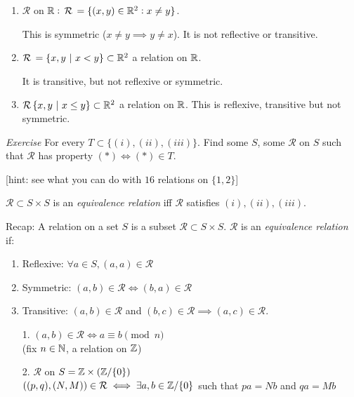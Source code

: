 \documentclass[twoside]{scrartcl}
\newcommand{\rel}{\mathcal{R}}
\begin{document}
\begin{examples}
	\begin{enumerate}
	\item $\rel$ on $\R: \,\rel\, = \{(x,y) \iR^2 : x \neq y\}$.
	
	This is symmetric ($x \neq y \implies y \neq x$). It is not reflective or transitive. 
	\item $\rel\, = \{x,y ~|~ x < y\} \subset \R^2$ a relation on $\mathbb{R}$. 	
	
	It is transitive, but not reflexive or symmetric. 
	
	\item $\rel\, \{x,y ~|~ x \leq y\} \subset \R^2$ a relation on $\mathbb{R}$. This is reflexive, transitive but not symmetric. 
	\end{enumerate}

\end{examples} 


\emph{Exercise} For every $T \subset \{(i),(ii),(iii)\}$. Find some $S$, some $\rel$ on $S$ such that $\rel$ has property $(*) \iff (*) \in T$. 

[hint: see what you can do with $16$ relations on $\{1,2\}$]\\

\begin{definition}
$\rel \subset S \times S$ is an \emph{equivalence relation} iff $\rel$ satisfies $(i), (ii), (iii)$. 	
\end{definition}







Recap: A 
relation on a set $S$ is a subset $\rel \subset S\times S$. $\rel$ is an \emph{equivalence relation} if: 
\begin{enumerate}
\item Reflexive: $\forall a \in S, (a,a) \in \rel$
\item Symmetric: $(a,b) \in \rel \iff (b,a) \in \rel$
\item Transitive: $(a,b) \in \rel$ and $(b,c) \in \rel \implies (a,c) \in \rel$.
\end{enumerate}\vspace*{10pt}


\begin{examples}
\begin{enumerate}
	

\item[1.] $(a,b) \in \rel \iff a \equiv b \pmod{n}$\\
(fix $n \in \mathbb{N}$, a relation on $\mathbb{Z}$)


\item[2.] $\rel$ on $S = \mathbb{Z} \times (\mathbb{Z} /\{0\})$\\
$((p,q),(N,M)) \in \rel \iff \exists a,b \in \Z/\{0\}$ such that $pa = Nb$ and $qa = Mb$
\end{enumerate}

\end{examples}\vspace*{5pt}
\end{document}
